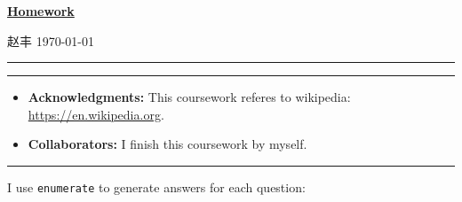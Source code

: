 \documentclass[a4paper]{article}
\begin{document}
\courseheader
{}
\setcounter{hwcnt}{6} %

\begin{center}
  \underline{\bf Homework \thehwcnt} \\
\end{center}
\begin{flushleft}
  赵丰\hfill
  \today
\end{flushleft}
\hrule

\vspace{2em}

\flushleft
\rule{\textwidth}{1pt}
\begin{itemize}
\item {\bf Acknowledgments: \/} 
  This coursework referes to wikipedia: \small{\url{https://en.wikipedia.org}}.

\item {\bf Collaborators: \/}
  I finish this coursework by myself.
\end{itemize}
\rule{\textwidth}{1pt}

\vspace{2em}

I use \texttt{enumerate} to generate answers for each question:
\end{document}
